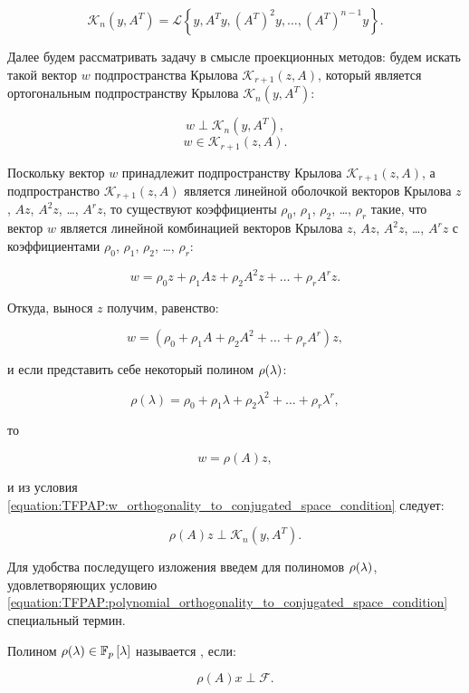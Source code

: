	$$ \mathcal K_n(y,A^T) = \mathcal L \left \{ y, A^T y, \left ( A^T \right ) ^2 y, \dots, \left ( A^T \right )^{n-1} y \right \}. $$

Далее будем рассматривать задачу в смысле проекционных методов: будем искать такой вектор $w$ подпространства
Крылова $\mathcal K_{r+1}(z, A)$, который является ортогональным подпространству Крылова $\mathcal K_n(y, A^T)$:

	\begin{equation} \label{equation:TFPAP:w_orthogonality_to_conjugated_space_condition}
		w \perp \mathcal K_n(y, A^T),
	\end{equation}
	$$ w \in \mathcal K_{r+1}(z, A). $$

Поскольку вектор $w$ принадлежит подпространству Крылова $\mathcal K_{r+1}(z, A)$, а подпространство $\mathcal K_{r+1}(z, A)$ является
линейной оболочкой векторов Крылова $z$, $Az$, $A^2z$, \dots, $A^rz$, то существуют коэффициенты $\rho_0$, $\rho_1$, $\rho_2$, \dots,
$\rho_r$ такие, что вектор $w$ является линейной комбинацией векторов Крылова $z$, $Az$, $A^2z$, \dots, $A^rz$
с коэффициентами $\rho_0$, $\rho_1$, $\rho_2$, \dots, $\rho_r$:

	$$ w = \rho_0 z + \rho_1 Az + \rho_2 A^2 z + \dots + \rho_r A^r z. $$

Откуда, вынося $z$ получим, равенство:

	$$ w = ( \rho_0 + \rho_1 A + \rho_2 A^2 + \dots + \rho_r A^r ) z, $$

и если представить себе некоторый полином $\rho (\lambda)$:

	$$ \rho(\lambda) = \rho_0 + \rho_1 \lambda + \rho_2 \lambda^2 + \dots + \rho_r \lambda^r, $$

то

	$$ w = \rho(A)z, $$
	
и из условия \eqref{equation:TFPAP:w_orthogonality_to_conjugated_space_condition} следует:

	\begin{equation} \label{equation:TFPAP:polynomial_orthogonality_to_conjugated_space_condition}
		\rho(A)z \perp \mathcal K_n(y, A^T).
	\end{equation}

Для удобства последущего изложения введем для полиномов $\rho (\lambda)$, удовлетворяющих условию 
\eqref{equation:TFPAP:polynomial_orthogonality_to_conjugated_space_condition} специальный термин.

\begin{definition}
	Полином $\rho (\lambda) \in \mathbb{F}_p \left [ \lambda \right ]$ называется , если:

	$$ \rho(A) x \perp \mathcal F. $$
\end{definition}

